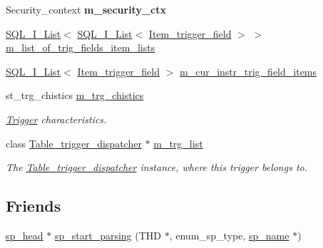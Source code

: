 \begin{DoxyCompactItemize}
Security\+\_\+context {\bfseries m\+\_\+security\+\_\+ctx}
\item 
\mbox{\hyperlink{classSQL__I__List}{S\+Q\+L\+\_\+\+I\+\_\+\+List}}$<$ \mbox{\hyperlink{classSQL__I__List}{S\+Q\+L\+\_\+\+I\+\_\+\+List}}$<$ \mbox{\hyperlink{classItem__trigger__field}{Item\+\_\+trigger\+\_\+field}} $>$ $>$ \mbox{\hyperlink{classsp__head_a55085dcc463202909164fe39c4f7bad9}{m\+\_\+list\+\_\+of\+\_\+trig\+\_\+fields\+\_\+item\+\_\+lists}}
\item 
\mbox{\hyperlink{classSQL__I__List}{S\+Q\+L\+\_\+\+I\+\_\+\+List}}$<$ \mbox{\hyperlink{classItem__trigger__field}{Item\+\_\+trigger\+\_\+field}} $>$ \mbox{\hyperlink{classsp__head_aff67bb1a63eae95edb8b96677229b537}{m\+\_\+cur\+\_\+instr\+\_\+trig\+\_\+field\+\_\+items}}
\item 
\mbox{\label{classsp__head_ad265c159d0acb031f7a47526cc4f6f97}} 
st\+\_\+trg\+\_\+chistics \mbox{\hyperlink{classsp__head_ad265c159d0acb031f7a47526cc4f6f97}{m\+\_\+trg\+\_\+chistics}}
\begin{DoxyCompactList}\small\item\em \mbox{\hyperlink{classTrigger}{Trigger}} characteristics. \end{DoxyCompactList}\item 
\mbox{\label{classsp__head_a5f2d84d2494019b76edcf8731b993a50}} 
class \mbox{\hyperlink{classTable__trigger__dispatcher}{Table\+\_\+trigger\+\_\+dispatcher}} $\ast$ \mbox{\hyperlink{classsp__head_a5f2d84d2494019b76edcf8731b993a50}{m\+\_\+trg\+\_\+list}}
\begin{DoxyCompactList}\small\item\em The \mbox{\hyperlink{classTable__trigger__dispatcher}{Table\+\_\+trigger\+\_\+dispatcher}} instance, where this trigger belongs to. \end{DoxyCompactList}\end{DoxyCompactItemize}
\subsection*{Friends}
\begin{DoxyCompactItemize}
\item 
\mbox{\hyperlink{classsp__head}{sp\+\_\+head}} $\ast$ \mbox{\hyperlink{classsp__head_a4b89bf4f505bfbf1b646caa220eff8e0}{sp\+\_\+start\+\_\+parsing}} (T\+HD $\ast$, enum\+\_\+sp\+\_\+type, \mbox{\hyperlink{classsp__name}{sp\+\_\+name}} $\ast$)
\end{DoxyCompactItemize}


